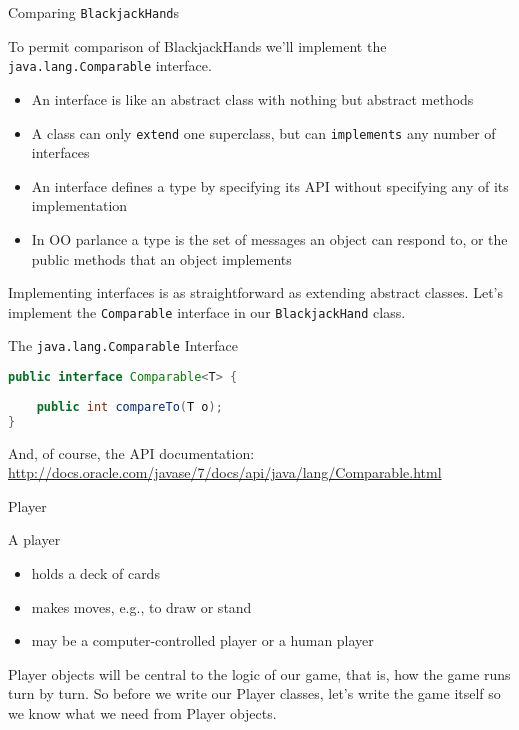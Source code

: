 \documentclass{beamer}
\begin{document}
\begin{frame}[fragile]{Comparing {\tt BlackjackHand}s}


To permit comparison of BlackjackHands we'll implement the {\tt java.lang.Comparable} interface.
\begin{itemize}
\item An interface is like an abstract class with nothing but abstract methods
\item A class can only {\tt extend} one superclass, but can {\tt implements} any number of interfaces
\item An interface defines a type by specifying its API without specifying any of its implementation
\item In OO parlance a type is the set of messages an object can respond to, or the public methods that an object implements
\end{itemize}

Implementing interfaces is as straightforward as extending abstract classes.  Let's implement the {\tt Comparable} interface in our {\tt BlackjackHand} class.

\end{frame}

\begin{frame}[fragile]{The {\tt java.lang.Comparable} Interface}


\begin{lstlisting}[language=Java]
public interface Comparable<T> {
    
    public int compareTo(T o);
}
\end{lstlisting}

And, of course, the API documentation: \url{http://docs.oracle.com/javase/7/docs/api/java/lang/Comparable.html}

\end{frame}

\begin{frame}[fragile]{Player}


A player
\begin{itemize}
\item holds a deck of cards
\item makes moves, e.g., to draw or stand
\item may be a computer-controlled player or a human player
\end{itemize}

Player objects will be central to the logic of our game, that is, how the game runs turn by turn.  So before we write our Player classes, let's write the game itself so we know what we need from Player objects.

\end{frame}
\end{document}

